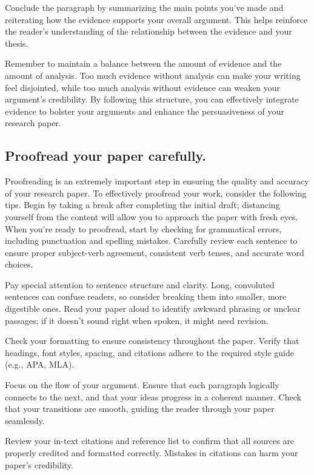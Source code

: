 \documentclass[
]{book}
\begin{document}
Conclude the paragraph by summarizing the main points you've made and reiterating how the evidence supports your overall argument. This helps reinforce the reader's understanding of the relationship between the evidence and your thesis.

Remember to maintain a balance between the amount of evidence and the amount of analysis. Too much evidence without analysis can make your writing feel disjointed, while too much analysis without evidence can weaken your argument's credibility. By following this structure, you can effectively integrate evidence to bolster your arguments and enhance the persuasiveness of your research paper.

\hypertarget{proofread-your-paper-carefully.}{%
\subsection*{Proofread your paper carefully.}\label{proofread-your-paper-carefully.}}

Proofreading is an extremely important step in ensuring the quality and accuracy of your research paper. To effectively proofread your work, consider the following tips. Begin by taking a break after completing the initial draft; distancing yourself from the content will allow you to approach the paper with fresh eyes. When you're ready to proofread, start by checking for grammatical errors, including punctuation and spelling mistakes. Carefully review each sentence to ensure proper subject-verb agreement, consistent verb tenses, and accurate word choices.

Pay special attention to sentence structure and clarity. Long, convoluted sentences can confuse readers, so consider breaking them into smaller, more digestible ones. Read your paper aloud to identify awkward phrasing or unclear passages; if it doesn't sound right when spoken, it might need revision.

Check your formatting to ensure consistency throughout the paper. Verify that headings, font styles, spacing, and citations adhere to the required style guide (e.g., APA, MLA).

Focus on the flow of your argument. Ensure that each paragraph logically connects to the next, and that your ideas progress in a coherent manner. Check that your transitions are smooth, guiding the reader through your paper seamlessly.

Review your in-text citations and reference list to confirm that all sources are properly credited and formatted correctly. Mistakes in citations can harm your paper's credibility.
\end{document}
